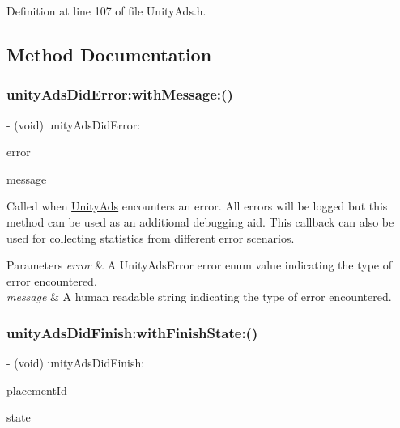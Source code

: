 Definition at line 107 of file Unity\+Ads.\+h.



\subsection{Method Documentation}
\mbox{\label{protocol_unity_ads_delegate-p_a2272989530c7cd577277d7f17bde3215}} 
\subsubsection{\texorpdfstring{unityAdsDidError:withMessage:()}{unityAdsDidError:withMessage:()}}
{\footnotesize\ttfamily -\/ (void) unity\+Ads\+Did\+Error\+: \begin{DoxyParamCaption}\item[{(Unity\+Ads\+Error)}]{error }\item[{with\+Message\+:(N\+S\+String $\ast$)}]{message }\end{DoxyParamCaption}}

Called when {\ttfamily \mbox{\hyperlink{interface_unity_ads}{Unity\+Ads}}} encounters an error. All errors will be logged but this method can be used as an additional debugging aid. This callback can also be used for collecting statistics from different error scenarios.


\begin{DoxyParams}{Parameters}
{\em error} & A {\ttfamily Unity\+Ads\+Error} error enum value indicating the type of error encountered. \\
\hline
{\em message} & A human readable string indicating the type of error encountered. \\
\hline
\end{DoxyParams}
\mbox{\label{protocol_unity_ads_delegate-p_a4b243b4d6d509ce4982bf8416f29dc42}} 
\subsubsection{\texorpdfstring{unityAdsDidFinish:withFinishState:()}{unityAdsDidFinish:withFinishState:()}}
{\footnotesize\ttfamily -\/ (void) unity\+Ads\+Did\+Finish\+: \begin{DoxyParamCaption}\item[{(N\+S\+String $\ast$)}]{placement\+Id }\item[{with\+Finish\+State\+:(Unity\+Ads\+Finish\+State)}]{state }\end{DoxyParamCaption}}

